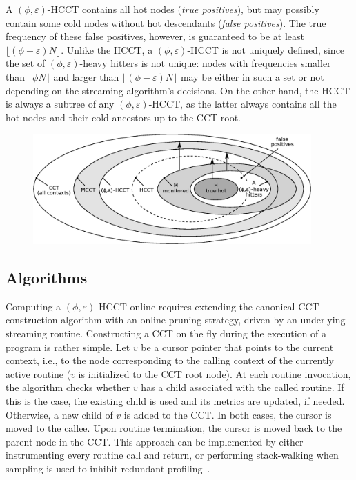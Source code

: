 \noindent A $(\phi,\varepsilon)$-HCCT contains all hot nodes ({\em true positives}), but may possibly contain some cold nodes without hot descendants ({\em false positives}). The true frequency of these false positives, however, is guaranteed to be at least $\lfloor(\phi-\varepsilon) N\rfloor$. Unlike the HCCT, a $(\phi,\varepsilon)$-HCCT is not uniquely defined, since the set of $(\phi,\varepsilon)$-heavy hitters is not unique: nodes with frequencies smaller than $\lfloor\phi N\rfloor$ and larger than $\lfloor(\phi-\varepsilon) N\rfloor$ may be either in such a set or not depending on the streaming algorithm's decisions.
On the other hand, the HCCT is always a subtree of any $(\phi,\varepsilon)$-HCCT, as the latter always contains all the hot nodes and their cold ancestors up to the CCT root.

\ifdefined\noauthorea
\begin{figure}[ht]
\centering
\includegraphics[width=0.95\textwidth]{figures/hcct-venn/hcct-venn.eps}
\caption{\protect}
\end{figure}
\fi

\subsection{Algorithms}
\label{ss:hcct-algorithms}

Computing a $(\phi,\varepsilon)$-HCCT online requires extending the canonical CCT construction algorithm with an online pruning strategy, driven by an underlying streaming routine. Constructing a CCT on the fly during the execution of a program is rather simple. Let $v$ be a cursor pointer that points to the current context, i.e., to the node corresponding to the calling context of the currently active routine ($v$ is initialized to the CCT root node). At each routine invocation, the algorithm checks whether $v$ has a child associated with the called routine. If this is the case, the existing child is used and its metrics are updated, if needed. Otherwise, a new child of $v$ is added to the CCT. In both cases, the cursor is moved to the callee. Upon routine termination, the cursor is moved back to the parent node in the CCT. This approach can be implemented by either instrumenting every routine call and return, or performing stack-walking when sampling is used to inhibit redundant profiling~\cite{Arnold00,Whaley00,Zhuang06}.

